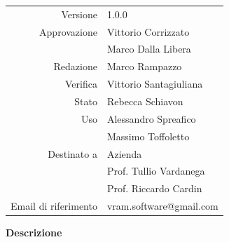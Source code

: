 \begin{titlepage}
\begin{center}
		\begin{tabular}{r | l} 
			Versione & 1.0.0 \\    %
			Approvazione & Vittorio Corrizzato \\  %
						 & Marco Dalla Libera \\
			Redazione & Marco Rampazzo \\
			Verifica & Vittorio Santagiuliana \\
			Stato & Rebecca Schiavon \\
			Uso & Alessandro Spreafico \\
				& Massimo Toffoletto \\
		    Destinato a & Azienda \\
						& Prof. Tullio Vardanega \\
						& Prof. Riccardo Cardin \\
			Email di riferimento& vram.software@gmail.com
		\end{tabular}
		\vfill
		\textbf{Descrizione} \\
		\DocDesc
	\end{center}
\end{titlepage}
\clearpage

\renewcommand{\footrulewidth}{1pt} %
\tableofcontents %
\label{LastPageRoman} %
\clearpage


\clearpage
